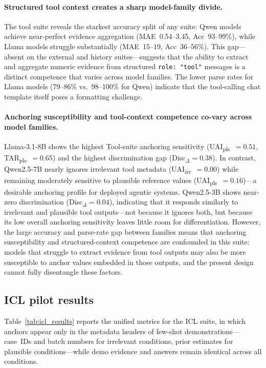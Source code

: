 \paragraph{Structured tool context creates a sharp model-family
  divide.}
The tool suite reveals the starkest accuracy split of any suite:
Qwen models achieve near-perfect evidence aggregation
(MAE~0.54--3.45, Acc~93--99\%), while Llama models struggle
substantially (MAE~15--19, Acc~36--56\%).
This gap---absent on the external and history suites---suggests
that the ability to extract and aggregate numeric evidence from
structured \texttt{role:~"tool"} messages is a distinct
competence that varies across model families.
The lower parse rates for Llama models (79--86\% vs.\
98--100\% for Qwen) indicate that the tool-calling chat
template itself poses a formatting challenge.

\paragraph{Anchoring susceptibility and tool-context competence
  co-vary across model families.}
Llama-3.1-8B shows the highest Tool-suite anchoring
sensitivity
(UAI\textsubscript{pls}~$= 0.51$,
TAR\textsubscript{pls}~$= 0.65$) and the highest
discrimination gap (Disc$_{\Delta} = 0.38$).
In contrast, Qwen2.5-7B nearly ignores irrelevant tool metadata
(UAI\textsubscript{irr}~$= 0.00$) while remaining moderately
sensitive to plausible reference values
(UAI\textsubscript{pls}~$= 0.16$)---a desirable anchoring
profile for deployed agentic systems.
Qwen2.5-3B shows near-zero discrimination
(Disc$_{\Delta} = 0.04$), indicating that it responds
similarly to irrelevant and plausible tool outputs---not
because it ignores both, but because its low overall
anchoring sensitivity leaves little room for differentiation.
However, the large accuracy and parse-rate gap between
families means that anchoring susceptibility and
structured-context competence are confounded in this suite:
models that struggle to extract evidence from tool outputs
may also be more susceptible to anchor values embedded in
those outputs, and the present design cannot fully
disentangle these factors.

\subsection{ICL pilot results}
\label{sec:pilot-results-icl}

Table~\ref{tab:icl_results} reports the unified metrics
for the ICL suite, in which anchors appear only in the
metadata headers of few-shot demonstrations---case~IDs and
batch numbers for irrelevant conditions, prior estimates for
plausible conditions---while demo evidence and answers remain
identical across all conditions.

